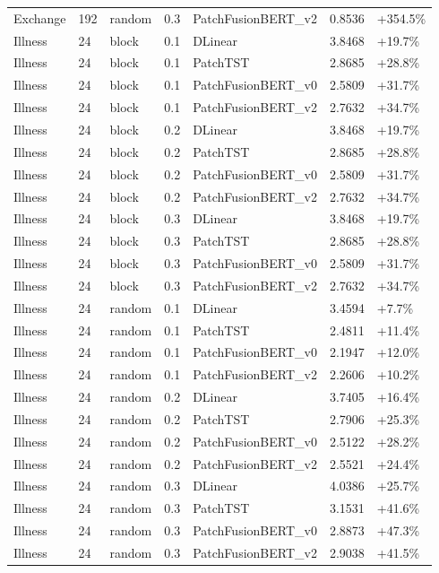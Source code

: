 \begin{tabular}{lllrlll}
Exchange & 192 & random & 0.3 & PatchFusionBERT_v2 & 0.8536 & +354.5\% \\
Illness & 24 & block & 0.1 & DLinear & 3.8468 & +19.7\% \\
Illness & 24 & block & 0.1 & PatchTST & 2.8685 & +28.8\% \\
Illness & 24 & block & 0.1 & PatchFusionBERT_v0 & 2.5809 & +31.7\% \\
Illness & 24 & block & 0.1 & PatchFusionBERT_v2 & 2.7632 & +34.7\% \\
Illness & 24 & block & 0.2 & DLinear & 3.8468 & +19.7\% \\
Illness & 24 & block & 0.2 & PatchTST & 2.8685 & +28.8\% \\
Illness & 24 & block & 0.2 & PatchFusionBERT_v0 & 2.5809 & +31.7\% \\
Illness & 24 & block & 0.2 & PatchFusionBERT_v2 & 2.7632 & +34.7\% \\
Illness & 24 & block & 0.3 & DLinear & 3.8468 & +19.7\% \\
Illness & 24 & block & 0.3 & PatchTST & 2.8685 & +28.8\% \\
Illness & 24 & block & 0.3 & PatchFusionBERT_v0 & 2.5809 & +31.7\% \\
Illness & 24 & block & 0.3 & PatchFusionBERT_v2 & 2.7632 & +34.7\% \\
Illness & 24 & random & 0.1 & DLinear & 3.4594 & +7.7\% \\
Illness & 24 & random & 0.1 & PatchTST & 2.4811 & +11.4\% \\
Illness & 24 & random & 0.1 & PatchFusionBERT_v0 & 2.1947 & +12.0\% \\
Illness & 24 & random & 0.1 & PatchFusionBERT_v2 & 2.2606 & +10.2\% \\
Illness & 24 & random & 0.2 & DLinear & 3.7405 & +16.4\% \\
Illness & 24 & random & 0.2 & PatchTST & 2.7906 & +25.3\% \\
Illness & 24 & random & 0.2 & PatchFusionBERT_v0 & 2.5122 & +28.2\% \\
Illness & 24 & random & 0.2 & PatchFusionBERT_v2 & 2.5521 & +24.4\% \\
Illness & 24 & random & 0.3 & DLinear & 4.0386 & +25.7\% \\
Illness & 24 & random & 0.3 & PatchTST & 3.1531 & +41.6\% \\
Illness & 24 & random & 0.3 & PatchFusionBERT_v0 & 2.8873 & +47.3\% \\
Illness & 24 & random & 0.3 & PatchFusionBERT_v2 & 2.9038 & +41.5\% \\

\end{tabular}
